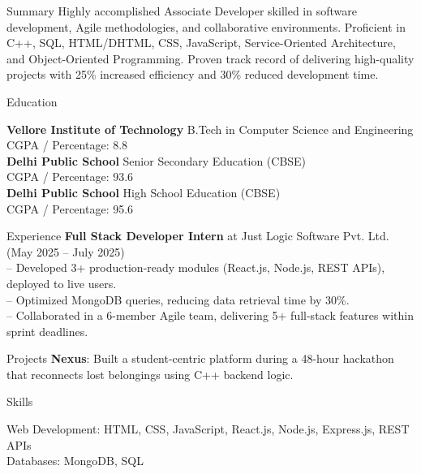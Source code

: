 \documentclass{resume}
\begin{document}
    \begin{rSection}{Summary}
    Highly accomplished Associate Developer skilled in software development, Agile methodologies, and collaborative environments. Proficient in C++, SQL, HTML/DHTML, CSS, JavaScript, Service-Oriented Architecture, and Object-Oriented Programming. Proven track record of delivering high-quality projects with 25\% increased efficiency and 30\% reduced development time.
    \end{rSection}

    \begin{rSection}{Education}
    
    \textbf{ Vellore Institute of Technology } \hfill B.Tech in Computer Science and Engineering\\
    CGPA / Percentage: 8.8\\[6pt]
    
    \textbf{ Delhi Public School } \hfill Senior Secondary Education (CBSE)\\
    CGPA / Percentage: 93.6\\[6pt]
    
    \textbf{ Delhi Public School } \hfill High School Education (CBSE)\\
    CGPA / Percentage: 95.6\\[6pt]
    
    \end{rSection}

    \begin{rSection}{Experience}
    \textbf{Full Stack Developer Intern} at Just Logic Software Pvt. Ltd. \hfill (May 2025 -- July 2025)\\
-- Developed 3+ production-ready modules (React.js, Node.js, REST APIs), deployed to live users.\\
-- Optimized MongoDB queries, reducing data retrieval time by 30\%.\\
-- Collaborated in a 6-member Agile team, delivering 5+ full-stack features within sprint deadlines.

    \end{rSection}

    \begin{rSection}{Projects}
    \textbf{Nexus}: Built a student-centric platform during a 48-hour hackathon that reconnects lost belongings using C++ backend logic.
    \end{rSection}

    \begin{rSection}{Skills}
    
    Web Development: HTML, CSS, JavaScript, React.js, Node.js, Express.js, REST APIs\\
    
    Databases: MongoDB, SQL\\
    
    \end{rSection}
\end{document}
